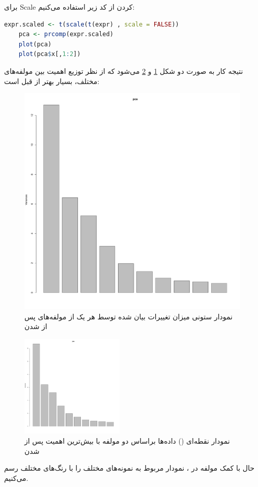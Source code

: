 \documentclass[12pt]{article}
\begin{document}
برای Scale کردن از کد زیر استفاده می‌کنیم:

\begin{latin}
	\begin{lstlisting}[language = R]
	expr.scaled <- t(scale(t(expr) , scale = FALSE))
	pca <- prcomp(expr.scaled)
	plot(pca)
	plot(pca$x[,1:2])
	\end{lstlisting}
\end{latin}

نتیجه کار به صورت دو شکل
\ref{fig:pcahist2}
و
\ref{fig:pcadot2}
می‌شود که از نظر توزیع اهمیت بین مولفه‌های مختلف، بسیار بهتر از قبل است:

\begin{figure}[h!]
	\centering	
	\includegraphics[width = 0.44 \textwidth , page=1]{./Results/pca_scaled.pdf}
	\caption{نمودار ستونی میزان تغییرات بیان شده توسط هر یک از مولفه‌های  پس از  شدن}
	\label{fig:pcahist2}
\end{figure}

\begin{figure}[h!]
	\centering	
	\includegraphics[width = 0.44\textwidth , page =2]{./Results/pca_scaled.pdf}
	\caption{نمودار نقطه‌ای () داده‌ها براساس دو مولفه با بیش‌ترین اهمیت پس از  شدن}
	\label{fig:pcadot2}
\end{figure}
\newpage

حال با کمک مولفه  در ، نمودار مربوط به نمونه‌های مختلف را با رنگ‌های مختلف رسم می‌کنیم.
\end{document}
